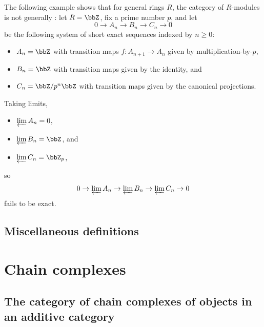 \begin{example}
    The following example shows that for general rings $R$, the category of $R$-modules is not generally : let $R = \bbZ$, fix a prime number $p$, and let
    $$0 \to A_n \to B_n \to C_n \to 0$$
    be the following system of short exact sequences indexed by $n \geq 0$: 
    \begin{itemize}
        \item $A_n = \bbZ$ with transition maps $f: A_{n+1} \to A_n$ given by multiplication-by-$p$,
        \item $B_n = \bbZ$ with transition maps given by the identity, and
        \item $C_n = \bbZ/p^n \bbZ$ with transition maps given by the canonical projections.
    \end{itemize}
    Taking limits, 
    \begin{itemize}
        \item $\varprojlim A_n = 0$,
        \item $\varprojlim B_n = \bbZ$, and 
        \item $\varprojlim C_n = \bbZ_p$,
    \end{itemize}
    so
    $$0 \to \varprojlim A_n \to \varprojlim B_n \to \varprojlim C_n \to 0$$
    fails to be exact.
\end{example}









\subsection{Miscellaneous definitions}



\section{Chain complexes}


\subsection{The category of chain complexes of objects in an additive category}

